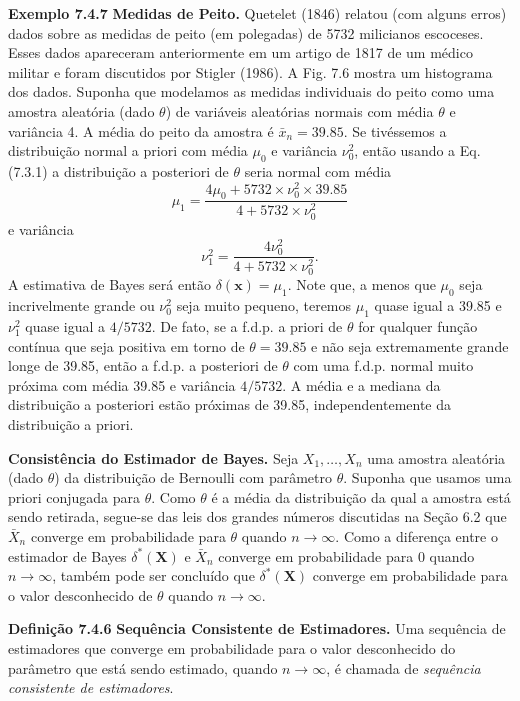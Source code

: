 \vspace{1cm}
\noindent\textbf{Exemplo 7.4.7} \quad \textbf{Medidas de Peito.} Quetelet (1846) relatou (com alguns erros) dados sobre as medidas de peito (em polegadas) de 5732 milicianos escoceses. Esses dados apareceram anteriormente em um artigo de 1817 de um médico militar e foram discutidos por Stigler (1986). A Fig. 7.6 mostra um histograma dos dados. Suponha que modelamos as medidas individuais do peito como uma amostra aleatória (dado $\theta$) de variáveis aleatórias normais com média $\theta$ e variância 4. A média do peito da amostra é $\bar{x}_n = 39.85$. Se tivéssemos a distribuição normal a priori com média $\mu_0$ e variância $\nu_0^2$, então usando a Eq. (7.3.1) a distribuição a posteriori de $\theta$ seria normal com média
$$ \mu_1 = \frac{4\mu_0+5732 \times \nu_0^2 \times 39.85}{4+5732 \times \nu_0^2} $$
e variância
$$ \nu_1^2 = \frac{4\nu_0^2}{4+5732 \times \nu_0^2}. $$
A estimativa de Bayes será então $\delta(\mathbf{x})=\mu_1$. Note que, a menos que $\mu_0$ seja incrivelmente grande ou $\nu_0^2$ seja muito pequeno, teremos $\mu_1$ quase igual a 39.85 e $\nu_1^2$ quase igual a $4/5732$. De fato, se a f.d.p. a priori de $\theta$ for qualquer função contínua que seja positiva em torno de $\theta=39.85$ e não seja extremamente grande longe de 39.85, então a f.d.p. a posteriori de $\theta$ com uma f.d.p. normal muito próxima com média 39.85 e variância $4/5732$. A média e a mediana da distribuição a posteriori estão próximas de 39.85, independentemente da distribuição a priori.

\vspace{1cm}
\vspace{1cm}

\noindent\textbf{Consistência do Estimador de Bayes.} Seja $X_1, \dots, X_n$ uma amostra aleatória (dado $\theta$) da distribuição de Bernoulli com parâmetro $\theta$. Suponha que usamos uma priori conjugada para $\theta$. Como $\theta$ é a média da distribuição da qual a amostra está sendo retirada, segue-se das leis dos grandes números discutidas na Seção 6.2 que $\bar{X}_n$ converge em probabilidade para $\theta$ quando $n \to \infty$. Como a diferença entre o estimador de Bayes $\delta^*(\mathbf{X})$ e $\bar{X}_n$ converge em probabilidade para 0 quando $n \to \infty$, também pode ser concluído que $\delta^*(\mathbf{X})$ converge em probabilidade para o valor desconhecido de $\theta$ quando $n \to \infty$.

\vspace{1cm}
\noindent\textbf{Definição 7.4.6} \quad \textbf{Sequência Consistente de Estimadores.} Uma sequência de estimadores que converge em probabilidade para o valor desconhecido do parâmetro que está sendo estimado, quando $n \to \infty$, é chamada de \textit{sequência consistente de estimadores}.

